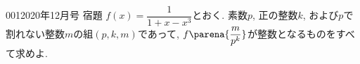 \begin{prob}{001}{}{2020年12月号 宿題}
 $f(x)=\dfrac{1}{1+x-x^3}$とおく. 素数$p$, 正の整数$k$, および$p$で割れない整数$m$の組$(p,k,m)$であって, $f\parena{\dfrac{m}{p^k}}$が整数となるものをすべて求めよ.
\end{prob}
